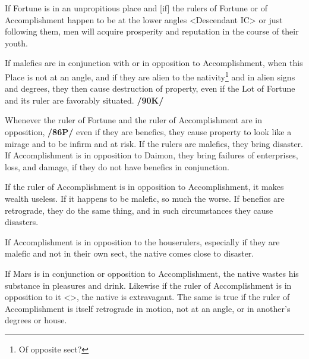 If Fortune is in an unpropitious place and [if] the rulers of Fortune or of Accomplishment happen to be at the lower angles <Descendant IC> or just following them, men will acquire prosperity and reputation in the course of their youth. 

If malefics are in conjunction with or in opposition to Accomplishment, when this Place is not at an angle, and if they are alien to the nativity\footnote{Of opposite sect?} and in alien signs and degrees, they then cause destruction of property, even if the Lot of Fortune and its ruler are favorably situated. \textbf{/90K/}

Whenever the ruler of Fortune and the ruler of Accomplishment are in opposition, \textbf{/86P/} even if they are benefics, they cause property to look like a mirage and to be infirm and at risk. If the rulers are malefics, they bring disaster. If Accomplishment is in opposition to Daimon, they bring failures of enterprises, loss, and damage, if they do not have benefics in conjunction. 

If the ruler of Accomplishment is in opposition to Accomplishment, it makes wealth useless. If it happens to be malefic, so much the worse. \mnbm If benefics are retrograde, they do the same thing, and in such circumstances they cause disasters. 

If Accomplishment is in opposition to the houserulers, especially if they are malefic and not in their own sect, the native comes close to disaster. 

If Mars is in conjunction or opposition to Accomplishment, the native wastes his substance in pleasures and drink. Likewise if the ruler of Accomplishment is in
opposition to it <\Mars>, the native is extravagant. The same is true if the ruler of Accomplishment is itself retrograde in motion, not at an angle, or in another’s degrees or house.

\newpage